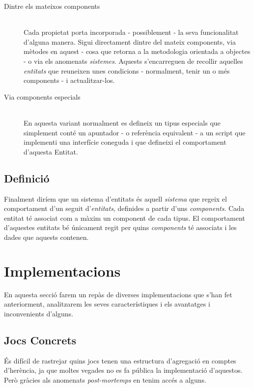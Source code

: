 \begin{description}
  \item[Dintre els mateixos components] \hfill \\
    Cada propietat porta incorporada - possiblement - la seva funcionalitat d'alguna manera. Sigui directament dintre del mateix components, via mètodes en aquest - cosa que retorna a la metodologia orientada a objectes - o via els anomenats {\em sistemes}. Aquests s'encarreguen de recollir aquelles {\em entitats} que reuneixen unes condicions - normalment, tenir un o més components - i actualitzar-los.
    
  \item[Via components especials] \hfill \\
    En aquesta variant normalment es defineix un tipus especials que simplement conté un apuntador - o referència equivalent - a un script que implementi una interfície coneguda i que defineixi el comportament d'aquesta Entitat.
    
\end{description}

\subsection{Definició}

Finalment diríem que un sistema d'entitats és aquell {\em sistema} que regeix el comportament d'un seguit d'{\em entitats}, definides a partir d'uns {\em components}. Cada entitat té associat com a màxim un component de cada tipus. El comportament d'aquestes entitats bé únicament regit per quins {\em components} té associats i les dades que aquests contenen.

\section{Implementacions}

En aquesta secció farem un repàs de diverses implementacions que s'han fet anteriorment, analitzarem les seves característiques i els avantatges i inconvenients d'alguns.

\subsection{Jocs Concrets}

És difícil de rastrejar quins jocs tenen una estructura d'agregació en comptes d'herència, ja que moltes vegades no es fa pública la implementació d'aquestos. Però gràcies als anomenats {\em post-mortemps} en tenim accés a alguns.

